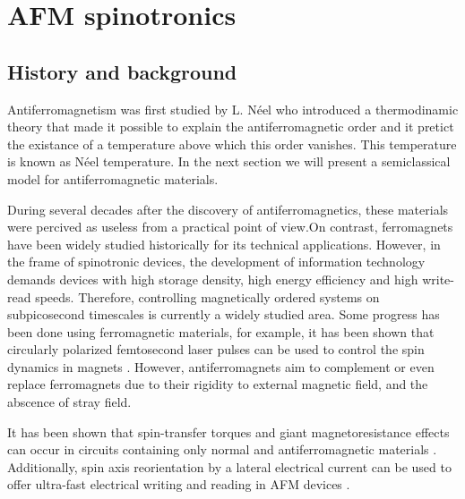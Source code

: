 \chapter{AFM spinotronics}

\section{History and background}

Antiferromagnetism was first studied by L. N\'eel who introduced a thermodinamic theory that made it possible to explain the antiferromagnetic order and it pretict the existance of a temperature above which this order vanishes. This temperature is known as N\'eel temperature. In the next section we will present a semiclassical model for antiferromagnetic materials.

During several decades after the discovery of antiferromagnetics, these materials were percived as useless from a practical point of view.On contrast, ferromagnets have been widely studied historically for its technical applications. However, in the frame of spinotronic devices, the development of information technology demands devices with high storage density, high energy efficiency and high write-read speeds. Therefore, controlling magnetically ordered systems on subpicosecond timescales is currently a widely studied area. Some progress has been done using ferromagnetic materials, for example, it has been shown that circularly polarized femtosecond laser pulses can be used to control the spin dynamics in magnets \cite{Kimel2005}. However, antiferromagnets aim to complement or even replace ferromagnets due to their rigidity to external magnetic field, and the abscence of stray field.

It has been shown that spin-transfer torques and giant magnetoresistance effects can occur in circuits containing only normal and antiferromagnetic materials \cite{MacDonald2011}. Additionally, spin axis reorientation by a lateral electrical current can be used to offer ultra-fast electrical writing and reading in AFM devices \cite{Zelezny2014}.

